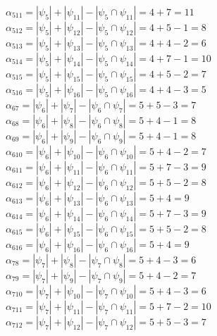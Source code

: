 \documentclass[12pt,a4paper]{report}
\begin{document}
$\alpha_{511} = |\psi_{5}| + |\psi_{11}| - |\psi_{5} \cap \psi_{11}| = 4 + 7 = 11$ \\
$\alpha_{512} = |\psi_{5}| + |\psi_{12}| - |\psi_{5} \cap \psi_{12}| = 4 + 5 - 1 = 8$ \\
$\alpha_{513} = |\psi_{5}| + |\psi_{13}| - |\psi_{5} \cap \psi_{13}| = 4 + 4 - 2 = 6$ \\
$\alpha_{514} = |\psi_{5}| + |\psi_{14}| - |\psi_{5} \cap \psi_{14}| = 4 + 7 - 1 = 10$ \\
$\alpha_{515} = |\psi_{5}| + |\psi_{15}| - |\psi_{5} \cap \psi_{15}| = 4 + 5 - 2 = 7$ \\
$\alpha_{516} = |\psi_{5}| + |\psi_{16}| - |\psi_{5} \cap \psi_{16}| = 4 + 4 - 3 = 5$ \\
$\alpha_{67} = |\psi_{6}| + |\psi_{7}| - |\psi_{6} \cap \psi_{7}| = 5 + 5 - 3 = 7$ \\
$\alpha_{68} = |\psi_{6}| + |\psi_{8}| - |\psi_{6} \cap \psi_{8}| = 5 + 4 - 1 = 8$ \\
$\alpha_{69} = |\psi_{6}| + |\psi_{9}| - |\psi_{6} \cap \psi_{9}| = 5 + 4 - 1 = 8$ \\
$\alpha_{610} = |\psi_{6}| + |\psi_{10}| - |\psi_{6} \cap \psi_{10}| = 5 + 4 - 2 = 7$ \\
$\alpha_{611} = |\psi_{6}| + |\psi_{11}| - |\psi_{6} \cap \psi_{11}| = 5 + 7 - 3 = 9$ \\
$\alpha_{612} = |\psi_{6}| + |\psi_{12}| - |\psi_{6} \cap \psi_{12}| = 5 + 5 - 2 = 8$ \\
$\alpha_{613} = |\psi_{6}| + |\psi_{13}| - |\psi_{6} \cap \psi_{13}| = 5 + 4 = 9$ \\
$\alpha_{614} = |\psi_{6}| + |\psi_{14}| - |\psi_{6} \cap \psi_{14}| = 5 + 7 - 3 = 9$ \\
$\alpha_{615} = |\psi_{6}| + |\psi_{15}| - |\psi_{6} \cap \psi_{15}| = 5 + 5 - 2 = 8$ \\
$\alpha_{616} = |\psi_{6}| + |\psi_{16}| - |\psi_{6} \cap \psi_{16}| = 5 + 4 = 9$ \\
$\alpha_{78} = |\psi_{7}| + |\psi_{8}| - |\psi_{7} \cap \psi_{8}| = 5 + 4 - 3 = 6$ \\
$\alpha_{79} = |\psi_{7}| + |\psi_{9}| - |\psi_{7} \cap \psi_{9}| = 5 + 4 - 2 = 7$ \\
$\alpha_{710} = |\psi_{7}| + |\psi_{10}| - |\psi_{7} \cap \psi_{10}| = 5 + 4 - 3 = 6$ \\
$\alpha_{711} = |\psi_{7}| + |\psi_{11}| - |\psi_{7} \cap \psi_{11}| = 5 + 7 - 2 = 10$ \\
$\alpha_{712} = |\psi_{7}| + |\psi_{12}| - |\psi_{7} \cap \psi_{12}| = 5 + 5 - 3 = 7$ \\
\end{document}
